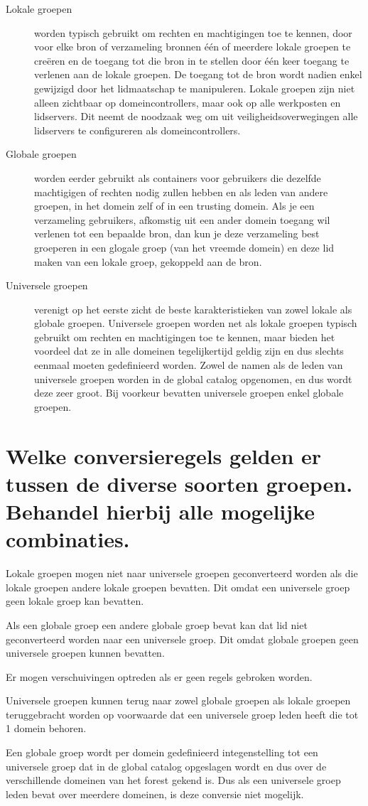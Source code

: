 \begin{description}
	\item[Lokale groepen] worden typisch gebruikt om rechten en machtigingen
		toe te kennen, door voor elke bron of verzameling bronnen één of
		meerdere lokale groepen te creëren en de toegang tot die bron in
		te stellen door één keer toegang te verlenen aan de lokale
		groepen. De toegang tot de bron wordt nadien enkel gewijzigd
		door het lidmaatschap te manipuleren. Lokale groepen zijn niet
		alleen zichtbaar op domeincontrollers, maar ook op alle
		werkposten en lidservers. Dit neemt de noodzaak weg om uit
		veiligheidsoverwegingen alle lidservers te configureren als
		domeincontrollers.
	\item[Globale groepen] worden eerder gebruikt als containers voor
		gebruikers die dezelfde machtigigen of rechten nodig zullen
		hebben en als leden van andere groepen, in het domein zelf of in
		een trusting domein. Als je een verzameling gebruikers,
		afkomstig uit een ander domein toegang wil verlenen tot een
		bepaalde bron, dan kun je deze verzameling best groeperen in een
		glogale groep (van het vreemde domein) en deze lid maken van een
		lokale groep, gekoppeld aan de bron.
	\item[Universele groepen] verenigt op het eerste zicht de beste
		karakteristieken van zowel lokale als globale groepen.
		Universele groepen worden net als lokale groepen typisch
		gebruikt om rechten en machtigingen toe te kennen, maar bieden
		het voordeel dat ze in alle domeinen tegelijkertijd geldig zijn
		en dus slechts eenmaal moeten gedefinieerd worden. Zowel de
		namen als de leden van universele groepen worden in de global
		catalog opgenomen, en dus wordt deze zeer groot. Bij voorkeur
		bevatten universele groepen enkel globale groepen.
\end{description}

\section{Welke conversieregels gelden er tussen de diverse soorten groepen.
Behandel hierbij alle mogelijke combinaties.}

Lokale groepen mogen niet naar universele groepen geconverteerd worden als die
lokale groepen andere lokale groepen bevatten. Dit omdat een universele groep
geen lokale groep kan bevatten.

Als een globale groep een andere globale groep bevat kan dat lid niet
geconverteerd worden naar een universele groep. Dit omdat globale groepen geen
universele groepen kunnen bevatten.

Er mogen verschuivingen optreden als er geen regels gebroken worden.

Universele groepen kunnen terug naar zowel globale groepen als lokale groepen
teruggebracht worden op voorwaarde dat een universele groep leden heeft die tot
1 domein behoren.

Een globale groep wordt per domein gedefinieerd integenstelling tot een
universele groep dat in de global catalog opgeslagen wordt en dus over de
verschillende domeinen van het forest gekend is. Dus als een universele groep
leden bevat over meerdere domeinen, is deze conversie niet mogelijk.
